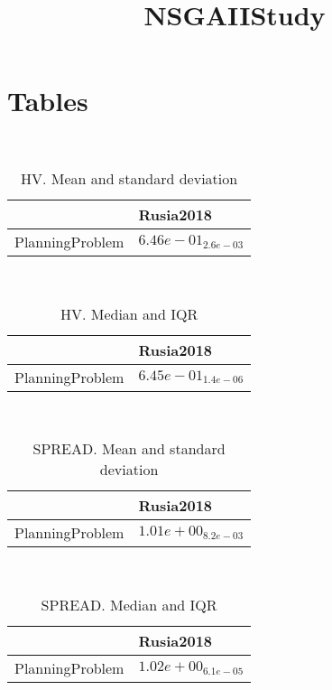 \documentclass{article}
\title{NSGAIIStudy}
\author{}
\begin{document}
\maketitle
\section{Tables}
\
\begin{table}
\caption{HV. Mean and standard deviation}
\label{table:mean.HV}
\centering
\begin{scriptsize}
\begin{tabular}{ll}
\hline &  Rusia2018\\
\hline
PlanningProblem & \cellcolor{gray95}$  6.46e-01_{ 2.6e-03}$ \\
\hline
\end{tabular}
\end{scriptsize}
\end{table}
\
\begin{table}
\caption{HV. Median and IQR}
\label{table:median.HV}
\begin{scriptsize}
\centering
\begin{tabular}{ll}
\hline &  Rusia2018\\
\hline
PlanningProblem & \cellcolor{gray95}$  6.45e-01_{ 1.4e-06}$ \\
\hline
\end{tabular}
\end{scriptsize}
\end{table}
\
\begin{table}
\caption{SPREAD. Mean and standard deviation}
\label{table:mean.SPREAD}
\centering
\begin{scriptsize}
\begin{tabular}{ll}
\hline &  Rusia2018\\
\hline
PlanningProblem & \cellcolor{gray95}$  1.01e+00_{ 8.2e-03}$ \\
\hline
\end{tabular}
\end{scriptsize}
\end{table}
\
\begin{table}
\caption{SPREAD. Median and IQR}
\label{table:median.SPREAD}
\begin{scriptsize}
\centering
\begin{tabular}{ll}
\hline &  Rusia2018\\
\hline
PlanningProblem & \cellcolor{gray95}$  1.02e+00_{ 6.1e-05}$ \\
\hline
\end{tabular}
\end{scriptsize}
\end{table}
\end{document}
